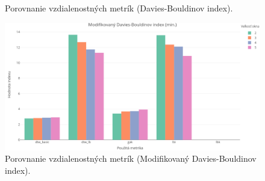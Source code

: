 \documentclass[a4paper,twoside,slovak,12pt,appendix]{article}
\begin{document}
\begin{appendices}
\begin{figure}[htbp]
  \caption{Porovnanie vzdialenostných metrík (Davies-Bouldinov index).}
\end{figure}
\begin{figure}[htbp]
  \centering
  \includegraphics[width=\textwidth]{cvi/metric_comparison/201902271851-DBstar-metric_comparison.png}
  \caption{Porovnanie vzdialenostných metrík (Modifikovaný Davies-Bouldinov index).}
\end{figure}


\end{appendices}
\end{document}
